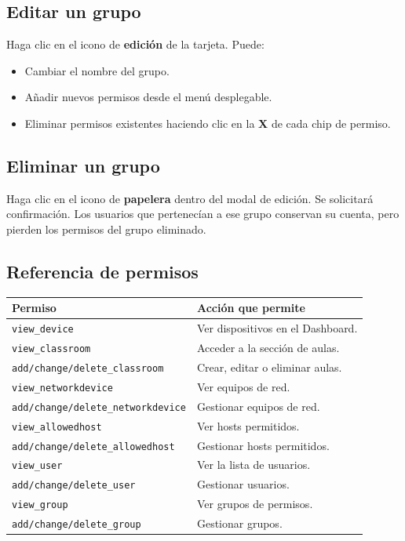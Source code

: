 \documentclass[12pt,a4paper]{article}
\begin{document}
\subsection{Editar un grupo}

Haga clic en el icono de \textbf{edición} de la tarjeta. Puede:
\begin{itemize}
    \item Cambiar el nombre del grupo.
    \item Añadir nuevos permisos desde el menú desplegable.
    \item Eliminar permisos existentes haciendo clic en la \textbf{X} de cada chip de permiso.
\end{itemize}

\subsection{Eliminar un grupo}

Haga clic en el icono de \textbf{papelera} dentro del modal de edición. Se solicitará confirmación. Los usuarios que pertenecían a ese grupo conservan su cuenta, pero pierden los permisos del grupo eliminado.

\subsection{Referencia de permisos}

\begin{table}[H]
\centering
\begin{tabularx}{\textwidth}{lX}
    \toprule
    \textbf{Permiso} & \textbf{Acción que permite} \\
    \midrule
    \texttt{view\_device}        & Ver dispositivos en el Dashboard. \\
    \texttt{view\_classroom}     & Acceder a la sección de aulas. \\
    \texttt{add/change/delete\_classroom} & Crear, editar o eliminar aulas. \\
    \texttt{view\_networkdevice} & Ver equipos de red. \\
    \texttt{add/change/delete\_networkdevice} & Gestionar equipos de red. \\
    \texttt{view\_allowedhost}   & Ver hosts permitidos. \\
    \texttt{add/change/delete\_allowedhost} & Gestionar hosts permitidos. \\
    \texttt{view\_user}          & Ver la lista de usuarios. \\
    \texttt{add/change/delete\_user} & Gestionar usuarios. \\
    \texttt{view\_group}         & Ver grupos de permisos. \\
    \texttt{add/change/delete\_group} & Gestionar grupos. \\
    \bottomrule
\end{tabularx}
\end{table}
\end{document}
